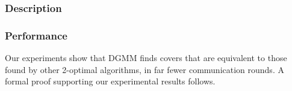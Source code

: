 \label{sub:algorithms-dgmm}
\subsubsection{Description}



\subsubsection{Performance}
\label{ssb:algorithms-dgmm-performance}

Our experiments show that DGMM finds covers that are equivalent to those found by other 2-optimal algorithms, in far fewer communication rounds. A formal proof supporting our experimental results follows.



